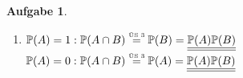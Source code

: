 \documentclass[11pt]{article}
\theoremstyle{break}
\newtheorem{task}{Aufgabe}
\begin{document}
\begin{task}
    \hfill\vspace{-5mm}
    \begin{enumerate}
        \item[(c)] $\mathbb{P}(A) = 1: \mathbb{P}(A\cap B) \stackrel{\mbox{\tiny ÜS 3}}{=} \mathbb{P}(B) = \underline{\underline{\mathbb{P}(A)\mathbb{P}(B)}}$\\
        $\mathbb{P}(A) = 0: \mathbb{P}(A\cap B) \stackrel{\mbox{\tiny ÜS 3}}{=} \mathbb{P}(A) = \underline{\underline{\mathbb{P}(A)\mathbb{P}(B)}}$
    \end{enumerate}
\end{task}
\end{document}
